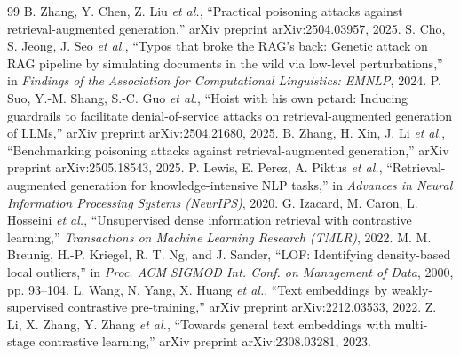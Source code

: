 \documentclass[conference]{IEEEtran}
\begin{document}
\begin{thebibliography}{99}
 B. Zhang, Y. Chen, Z. Liu \emph{et al.}, ``Practical poisoning attacks against retrieval-augmented generation,'' arXiv preprint arXiv:2504.03957, 2025.
 S. Cho, S. Jeong, J. Seo \emph{et al.}, ``Typos that broke the RAG's back: Genetic attack on RAG pipeline by simulating documents in the wild via low-level perturbations,'' in \emph{Findings of the Association for Computational Linguistics: EMNLP}, 2024.
 P. Suo, Y.-M. Shang, S.-C. Guo \emph{et al.}, ``Hoist with his own petard: Inducing guardrails to facilitate denial-of-service attacks on retrieval-augmented generation of LLMs,'' arXiv preprint arXiv:2504.21680, 2025.
 B. Zhang, H. Xin, J. Li \emph{et al.}, ``Benchmarking poisoning attacks against retrieval-augmented generation,'' arXiv preprint arXiv:2505.18543, 2025.
 P. Lewis, E. Perez, A. Piktus \emph{et al.}, ``Retrieval-augmented generation for knowledge-intensive NLP tasks,'' in \emph{Advances in Neural Information Processing Systems (NeurIPS)}, 2020.
 G. Izacard, M. Caron, L. Hosseini \emph{et al.}, ``Unsupervised dense information retrieval with contrastive learning,'' \emph{Transactions on Machine Learning Research (TMLR)}, 2022.
 M. M. Breunig, H.-P. Kriegel, R. T. Ng, and J. Sander, ``LOF: Identifying density-based local outliers,'' in \emph{Proc. ACM SIGMOD Int. Conf. on Management of Data}, 2000, pp. 93--104.
 L. Wang, N. Yang, X. Huang \emph{et al.}, ``Text embeddings by weakly-supervised contrastive pre-training,'' arXiv preprint arXiv:2212.03533, 2022.
 Z. Li, X. Zhang, Y. Zhang \emph{et al.}, ``Towards general text embeddings with multi-stage contrastive learning,'' arXiv preprint arXiv:2308.03281, 2023.
\end{thebibliography}
\end{document}
